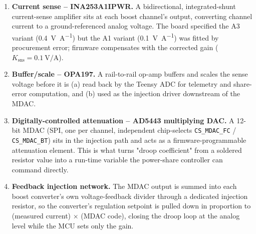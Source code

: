 \begin{enumerate}
  \item \textbf{Current sense -- INA253A1IPWR.} A bidirectional,
    integrated-shunt current-sense amplifier sits at each boost channel's
    output, converting channel current to a ground-referenced analog
    voltage. The board specified the A3 variant (\SI{0.4}{\volt\per\ampere})
    but the A1 variant (\SI{0.1}{\volt\per\ampere}) was fitted by
    procurement error; firmware compensates with the corrected gain
    ($K_\text{sns} = \SI{0.1}{\volt\per\ampere}$).
  \item \textbf{Buffer/scale -- OPA197.} A rail-to-rail op-amp buffers and
    scales the sense voltage before it is (a) read back by the Teensy ADC
    for telemetry and share-error computation, and (b) used as the
    injection driver downstream of the MDAC.
  \item \textbf{Digitally-controlled attenuation -- AD5443 multiplying
    DAC.} A 12-bit MDAC (SPI, one per channel, independent chip-selects
    \texttt{CS\_MDAC\_FC} / \texttt{CS\_MDAC\_BT}) sits in the injection
    path and acts as a firmware-programmable attenuation
    element. This is what turns "droop coefficient" from a soldered
    resistor value into a run-time variable the power-share controller
    can command directly.
  \item \textbf{Feedback injection network.} The MDAC output is summed
    into each boost converter's own voltage-feedback divider through a
    dedicated injection resistor, so the converter's regulation setpoint
    is pulled down in proportion to (measured current) $\times$ (MDAC
    code), closing the droop loop at the analog level while the MCU sets
    only the gain.
\end{enumerate}


